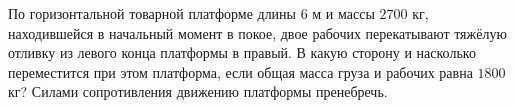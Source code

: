 По горизонтальной товарной платформе длины $6$ м и массы $2700$ кг,
находившейся в начальный момент в покое, двое рабочих перекатывают
тяжёлую отливку из левого конца платформы в правый. В какую сторону и
насколько переместится при этом платформа, если общая масса груза и
рабочих равна $1800$ кг?
Силами сопротивления движению платформы пренебречь.
